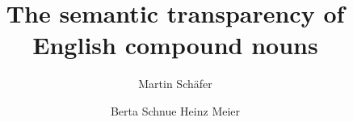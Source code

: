 \author{Martin Schäfer \and Berta Schnue \lastand Heinz Meier}
\title{The semantic transparency of English compound nouns}
\subtitle{}
\renewcommand{\lsSeries}{mi}
\renewcommand{\lsSeriesNumber}{}
\renewcommand{\lsID}{123}
